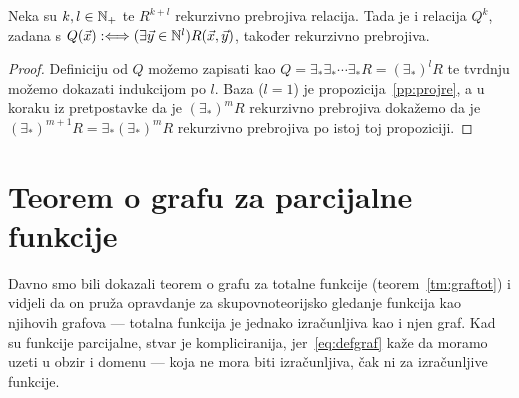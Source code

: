 \begin{korolar}[{name=[višestruka projekcija čuva rekurzivnu prebrojivost]}]\label{kor:projre}
Neka su $k,l\in{\mathbb N}_+$ te $R^{k+l}$ rekurzivno prebrojiva relacija. Tada je i relacija $Q^k$, zadana s $Q(\vec x):\Longleftrightarrow(\exists\vec y\in{\mathbb N}^l)R(\vec x,\vec y)$, također rekurzivno prebrojiva.
\end{korolar}
\begin{proof}
%
Definiciju od $Q$ možemo zapisati kao $Q=\exists_*\exists_*\dotsi\exists_*R=(\exists_*\!)^lR$ te tvrdnju možemo dokazati indukcijom po $l$. Baza ($l=1$) je propozicija~\ref{pp:projre}, a u koraku iz pretpostavke da je $(\exists_*\!)^mR$ rekurzivno prebrojiva dokažemo da je $(\exists_*\!)^{m+1}R=\exists_*(\exists_*\!)^mR$ rekurzivno prebrojiva po istoj toj propoziciji.
\end{proof}

\section{Teorem o grafu za parcijalne funkcije}

Davno smo bili dokazali teorem o grafu za totalne funkcije (teorem~\ref{tm:graftot}) i vidjeli da on pruža opravdanje za skupovnoteorijsko gledanje funkcija kao njihovih grafova --- totalna funkcija je jednako izračunljiva kao i njen graf. Kad su funkcije parcijalne, stvar je  kompliciranija, jer~\eqref{eq:defgraf} kaže da moramo uzeti u obzir i domenu --- koja ne mora biti izračunljiva, čak ni za izračunljive funkcije.

